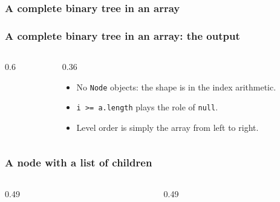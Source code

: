 \documentclass[aspectratio=169,10pt,compress]{beamer}
\begin{document}




\begin{frame}[t,fragile] \frametitle{A complete binary tree in an array}
\end{frame}




\begin{frame}[t,fragile] \frametitle{A complete binary tree in an array: the output}
  \begin{columns}[T]
    \begin{column}{0.6\textwidth}
    \end{column}
    \begin{column}{0.36\textwidth}
      \begin{itemize}\small
        \item No \texttt{Node} objects: the shape is in the index arithmetic.
        \item \texttt{i >= a.length} plays the role of \texttt{null}.
        \item Level order is simply the array from left to right.
      \end{itemize}
    \end{column}
  \end{columns}
\end{frame}





\begin{frame}[t,fragile] \frametitle{A node with a list of children}
  \begin{columns}[T]
    \begin{column}{0.49\textwidth}
    \end{column}
    \begin{column}{0.49\textwidth}
    \end{column}
  \end{columns}
\end{frame}
\end{document}
